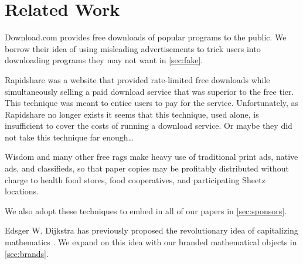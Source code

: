 \section{Related Work}
\label{sec:related}

Download.com \cite{download-com} provides free downloads of popular programs to
the public.
We borrow their idea of using misleading advertisements to trick users into
downloading programs they may not want in \autoref{sec:fake}.

Rapidshare \cite{rapidshare} was a website that provided rate-limited free
downloads while simultaneously selling a paid download service that was
superior to the free tier.
This technique was meant to entice users to pay for the service.
Unfortunately, as Rapidshare no longer exists it seems that this technique, used alone,
is insufficient to cover the costs of running a download service. Or maybe they
did not take this technique far enough\ldots

Wisdom \cite{wisdom} and many other free rags make heavy use of
traditional print ads, native ads, and classifieds,
so that paper copies may be profitably distributed without charge to health food stores, food cooperatives, and participating Sheetz locations.

We also adopt these techniques to embed in all of our papers in
\autoref{sec:sponsors}.

Edsger W. Dijkstra has previously proposed the revolutionary idea of
capitalizing mathematics \cite{cap-math}.
We expand on this idea with our branded mathematical objects in
\autoref{sec:brands}.
